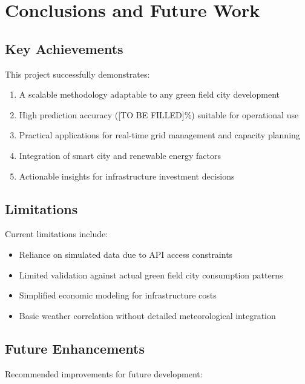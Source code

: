 \documentclass[12pt,a4paper]{article}
\begin{document}
\section{Conclusions and Future Work}

\subsection{Key Achievements}
This project successfully demonstrates:

\begin{enumerate}
    \item A scalable methodology adaptable to any green field city development
    \item High prediction accuracy ([TO BE FILLED]\%) suitable for operational use
    \item Practical applications for real-time grid management and capacity planning
    \item Integration of smart city and renewable energy factors
    \item Actionable insights for infrastructure investment decisions
\end{enumerate}

\subsection{Limitations}
Current limitations include:

\begin{itemize}
    \item Reliance on simulated data due to API access constraints
    \item Limited validation against actual green field city consumption patterns
    \item Simplified economic modeling for infrastructure costs
    \item Basic weather correlation without detailed meteorological integration
\end{itemize}

\subsection{Future Enhancements}
Recommended improvements for future development:
\end{document}
